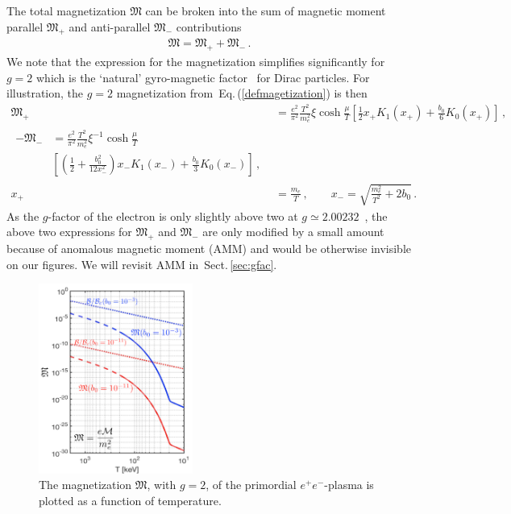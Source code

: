 \documentclass[aps,prd,floatfix,reprint]{revtex4-2}
\newcommand{\req}[1]{Eq.\,(\ref{#1})}
\newcommand{\rsec}[1]{Sect.\,{\ref{#1}}}
\begin{document}
The total magnetization ${\mathfrak M}$ can be broken into the sum of magnetic moment parallel ${\mathfrak M}_{+}$ and anti-parallel ${\mathfrak M}_{-}$ contributions
\begin{align}
\label{g2mag}
{\mathfrak M}={\mathfrak M}_{+}+{\mathfrak M}_{-}\,.
\end{align}
We note that the expression for the magnetization simplifies significantly for $g=2$ which is the `natural' gyro-magnetic factor~\cite{Evans:2022fsu,Rafelski:2022bsv} for Dirac particles. For illustration, the $g=2$ magnetization from~\req{defmagetization} is then
\begin{align}
 \label{g2magplus}
 {\mathfrak M}_{+}&=\frac{e^{2}}{\pi^{2}}\frac{T^{2}}{m_{e}^{2}}\xi\cosh{\frac{\mu}{T}}\left[\frac{1}{2}x_{+}K_{1}(x_{+})+\frac{b_{0}}{6}K_{0}(x_{+})\right]\,,\\
\begin{split} 
 \label{g2magminus}
 -{\mathfrak M}_{-}&=\frac{e^{2}}{\pi^{2}}\frac{T^{2}}{m_{e}^{2}}\xi^{-1}\cosh{\frac{\mu}{T}}\\
 &\left[\left(\frac{1}{2}+\frac{b_{0}^{2}}{12x_{-}^{2}}\right)x_{-}K_{1}(x_{-})+\frac{b_{0}}{3}K_{0}(x_{-})\right]\,,
\end{split}\\
 x_{+}&=\frac{m_{e}}{T}\,,\qquad
 x_{-}=\sqrt{\frac{m_{e}^{2}}{T^{2}}+2b_{0}}\,.
\end{align}
As the $g$-factor of the electron is only slightly above two at $g\simeq2.00232$~\cite{Tiesinga:2021myr}, the above two expressions for ${\mathfrak M}_{+}$ and ${\mathfrak M}_{-}$ are only modified by a small amount because of anomalous magnetic moment (AMM) and would be otherwise invisible on our figures. We will revisit AMM in~\rsec{sec:gfac}.

\begin{figure}[ht]
 \centering
 \includegraphics[width=0.45\textwidth]{plots/Magnetization_Hc_new004.png}
 \caption{The magnetization ${\mathfrak M}$, with $g=2$, of the primordial $e^{+}e^{-}$-plasma is plotted as a function of temperature.}
 \label{fig:magnet} 
\end{figure}
\end{document}
